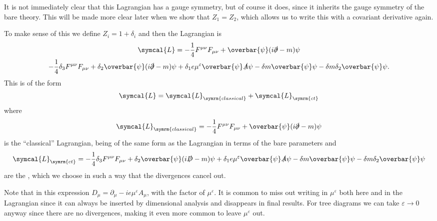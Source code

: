 \documentclass[fleqn]{NotesClass}
\newcommand{\diracadjoint}[1]{\overbar{#1}}
\newcommand{\covariantDerivative}{D}
\newcommand{\lagrangianDensity}{\symcal{L}}
\begin{document}
    It is not immediately clear that this Lagrangian has a gauge symmetry, but of course it does, since it inherits the gauge symmetry of the bare theory.
    This will be made more clear later when we show that \(Z_1 = Z_2\), which allows us to write this with a covariant derivative again.
    
    To make sense of this we define \(Z_i = 1 + \delta_i\) and then the Lagrangian is
    \begin{multline}
        \lagrangianDensity = -\frac{1}{4}F^{\mu\nu}F_{\mu\nu} + \diracadjoint{\psi}(i\slashed{\partial} - m)\psi\\
        - \frac{1}{4}\delta_3 F^{\mu\nu} F_{\mu\nu} + \delta_2 \diracadjoint{\psi}(i\slashed{\partial} - m)\psi + \delta_1 e\mu^{\varepsilon}\diracadjoint{\psi}\slashed{A}\psi - \delta m\diracadjoint{\psi} \psi - \delta m \delta_2 \diracadjoint{\psi} \psi.
    \end{multline}
    This is of the form
    \begin{equation}
        \lagrangianDensity = \lagrangianDensity_{\symrm{classical}} + \lagrangianDensity_{\symrm{ct}}
    \end{equation}
    where
    \begin{equation}
        \lagrangianDensity_{\symrm{classical}} = -\frac{1}{4}F^{\mu\nu}F_{\mu\nu} + \diracadjoint{\psi}(i\slashed{\partial} - m)\psi
    \end{equation}
    is the \enquote{classical} Lagrangian, being of the same form as the Lagrangian in terms of the bare parameters and
    \begin{equation}
        \lagrangianDensity_{\symrm{ct}} = -\frac{1}{4}\delta_3 F^{\mu\nu} F_{\mu\nu} + \delta_2 \diracadjoint{\psi}(i\slashed{\covariantDerivative} - m)\psi + \delta_1 e\mu^{\varepsilon}\diracadjoint{\psi}\slashed{A}\psi - \delta m\diracadjoint{\psi} \psi - \delta m \delta_2 \diracadjoint{\psi} \psi
    \end{equation}
    are the , which we choose in such a way that the divergences cancel out.
    
    Note that in this expression \(\covariantDerivative_\mu = \partial_\mu - ie\mu^{\varepsilon}A_\mu\), with the factor of \(\mu^\varepsilon\).
    It is common to miss out writing in \(\mu^\varepsilon\) both here and in the Lagrangian since it can always be inserted by dimensional analysis and disappears in final results.
    For tree diagrams we can take \(\varepsilon \to 0\) anyway since there are no divergences, making it even more common to leave \(\mu^\varepsilon\) out.
    
\end{document}

